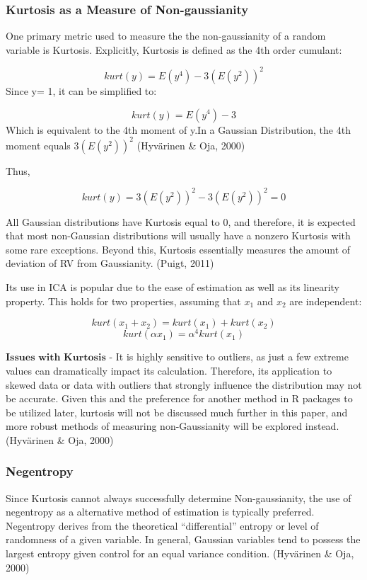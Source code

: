 \documentclass[12pt,twoside]{amherstthesis}
\begin{document}
  \subsubsection{Kurtosis as a Measure of
  Non-gaussianity}\label{kurtosis-as-a-measure-of-non-gaussianity}
  
  One primary metric used to measure the the non-gaussianity of a random
  variable is Kurtosis. Explicitly, Kurtosis is defined as the 4th order
  cumulant:
  
  \[ kurt(y) = E(y^4) - 3(E(y^2))^2\] Since y= 1, it can be simplified to:
  
  \[ kurt(y) = E(y^4) - 3 \] Which is equivalent to the 4th moment of y.In
  a Gaussian Distribution, the 4th moment equals \(3(E(y^2))^2\)
  (Hyvärinen \& Oja, 2000)
  
  Thus,
  
  \[ kurt(y) = 3(E(y^2))^2 - 3(E(y^2))^2 = 0 \]
  
  All Gaussian distributions have Kurtosis equal to 0, and therefore, it
  is expected that most non-Gaussian distributions will usually have a
  nonzero Kurtosis with some rare exceptions. Beyond this, Kurtosis
  essentially measures the amount of deviation of RV from Gaussianity.
  (Puigt, 2011)
  
  Its use in ICA is popular due to the ease of estimation as well as its
  linearity property. This holds for two properties, assuming that \(x_1\)
  and \(x_2\) are independent:
  
  \[ kurt(x_1 + x_2) = kurt(x_1) + kurt(x_2)\]
  \[ kurt(\alpha x_1) = \alpha^4 kurt(x_1)\]
  
  \(\textbf{Issues with Kurtosis}\) - It is highly sensitive to outliers,
  as just a few extreme values can dramatically impact its calculation.
  Therefore, its application to skewed data or data with outliers that
  strongly influence the distribution may not be accurate. Given this and
  the preference for another method in R packages to be utilized later,
  kurtosis will not be discussed much further in this paper, and more
  robust methods of measuring non-Gaussianity will be explored
  instead.(Hyvärinen \& Oja, 2000)
  
  \subsubsection{Negentropy}\label{negentropy}
  
  Since Kurtosis cannot always successfully determine Non-gaussianity, the
  use of negentropy as a alternative method of estimation is typically
  preferred. Negentropy derives from the theoretical ``differential''
  entropy or level of randomness of a given variable. In general, Gaussian
  variables tend to possess the largest entropy given control for an equal
  variance condition. (Hyvärinen \& Oja, 2000)
  
\end{document}
